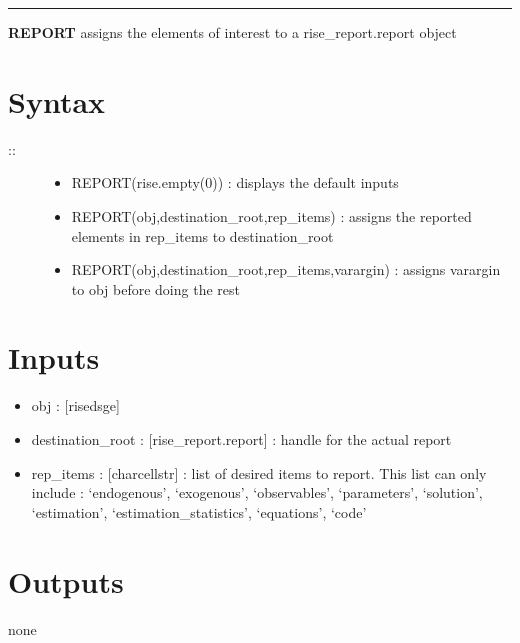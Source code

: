 \documentclass[letterpaper,10pt,english]{sphinxmanual}
\begin{document}
\bigskip\hrule{}\bigskip

\label{classes/models/@dsge/dsge:report}
\textbf{REPORT} assigns the elements of interest to a rise\_report.report object


\section{Syntax}
\label{classes/models/@dsge/dsge:id138}\begin{description}
\item[{::}] \leavevmode\begin{itemize}
\item {} 
REPORT(rise.empty(0)) : displays the default inputs

\item {} 
REPORT(obj,destination\_root,rep\_items) : assigns the reported
elements in rep\_items to destination\_root

\item {} 
REPORT(obj,destination\_root,rep\_items,varargin) : assigns varargin to
obj before doing the rest

\end{itemize}

\end{description}


\section{Inputs}
\label{classes/models/@dsge/dsge:id139}\begin{itemize}
\item {} 
obj : {[}rise\textbar{}dsge{]}

\item {} 
destination\_root : {[}rise\_report.report{]} : handle for the actual report

\item {} 
rep\_items : {[}char\textbar{}cellstr{]} : list of desired items to report. This list
can only include : `endogenous', `exogenous', `observables',
`parameters', `solution', `estimation', `estimation\_statistics',
`equations', `code'

\end{itemize}


\section{Outputs}
\label{classes/models/@dsge/dsge:id140}
none
\end{document}
